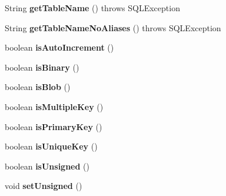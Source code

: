 \begin{DoxyCompactItemize}
\item 
\mbox{\label{classcom_1_1mysql_1_1jdbc_1_1_field_ae196506de2514cfadb3072f1384f22ae}} 
String {\bfseries get\+Table\+Name} ()  throws S\+Q\+L\+Exception 
\item 
\mbox{\label{classcom_1_1mysql_1_1jdbc_1_1_field_a645c868a2c130ebfbd1fefac995b3b8b}} 
String {\bfseries get\+Table\+Name\+No\+Aliases} ()  throws S\+Q\+L\+Exception 
\item 
\mbox{\label{classcom_1_1mysql_1_1jdbc_1_1_field_a43dd1005704f2c17d96bba7b908bf846}} 
boolean {\bfseries is\+Auto\+Increment} ()
\item 
\mbox{\label{classcom_1_1mysql_1_1jdbc_1_1_field_a215a68ef41f6467e84739d6249ec0a85}} 
boolean {\bfseries is\+Binary} ()
\item 
\mbox{\label{classcom_1_1mysql_1_1jdbc_1_1_field_a73a35e3882d28047f1e02534f43846d3}} 
boolean {\bfseries is\+Blob} ()
\item 
\mbox{\label{classcom_1_1mysql_1_1jdbc_1_1_field_ac63b0f71e25bcf16baecf5a22fa52886}} 
boolean {\bfseries is\+Multiple\+Key} ()
\item 
\mbox{\label{classcom_1_1mysql_1_1jdbc_1_1_field_a634e04b9539b66d30bf4d92fd956feef}} 
boolean {\bfseries is\+Primary\+Key} ()
\item 
\mbox{\label{classcom_1_1mysql_1_1jdbc_1_1_field_ab1d33d139c907cd58bea68399dd63308}} 
boolean {\bfseries is\+Unique\+Key} ()
\item 
\mbox{\label{classcom_1_1mysql_1_1jdbc_1_1_field_aa146e94d15b70dab0718a39da080628e}} 
boolean {\bfseries is\+Unsigned} ()
\item 
\mbox{\label{classcom_1_1mysql_1_1jdbc_1_1_field_a69007bc17d4b052dc9ba916f6bcf88be}} 
void {\bfseries set\+Unsigned} ()

\end{DoxyCompactItemize}
